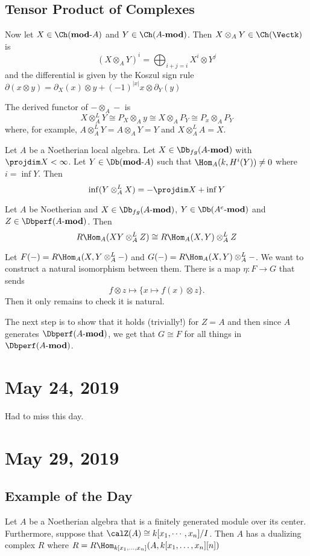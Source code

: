 \documentclass[12pt]{article}
\newcommand*{\modA}{\mathbf{mod}\text{-}A}
\newcommand*{\Amod}{A\text{-}\mathbf{mod}}
\begin{document}
\subsection{Tensor Product of Complexes}
Now let $X\in\Ch(\modA)$ and $Y\in\Ch(\Amod)$. Then $X\otimes_A Y\in\Ch(\Vectk)$ is
\[(X\otimes_A Y)^i=\bigoplus_{i+j=i}X^i\otimes Y^j\]
and the differential is given by the Koszul sign rule $\partial(x\otimes y)=\partial_X(x)\otimes y+(-1)^|x|x\otimes\partial_Y(y)$

The derived functor of $-\otimes_A-$ is 
\[X\otimes_A^LY\cong P_X\otimes_A y\cong X\otimes_A P_Y\cong P_x\otimes_AP_Y\]
where, for example, $A\otimes_A^LY=A\otimes_AY=Y$ and $X\otimes_A^LA=X$.

\begin{thm}
	Let $A$ be a Noetherian local algebra. Let $X\in\Db_{fg}(\Amod)$ with $\projdim X<\infty$. Let $Y\in\Db(\modA)$
	such that $\Hom_A(k,H^i(Y))\ne 0$ where $i=\inf Y$. Then 
	\[\inf(Y\otimes_A^LX)=-\projdim X+\inf Y\]
\end{thm}

\begin{lem}
	Let $A$ be Noetherian and $X\in\Db_{fg}(\Amod)$, $Y\in\Db(A^e\text{-}\mathbf{mod})$ and $Z\in \Dbperf(\Amod)$. Then 
	\[R\Hom_A(XY\otimes_A^LZ)\cong R\Hom_A(X,Y)\otimes_A^LZ\]
\end{lem}
\begin{prf}
	Let $F(-)=R\Hom_A(X,Y\otimes_A^L-)$ and $G(-)=R\Hom_A(X,Y)\otimes_A^L-$. We want to construct 
	a natural isomorphism between them. There is a map $\eta:F\to G$ that sends 
	\[f\otimes z\mapsto \{x\mapsto f(x)\otimes z\}.\]
	Then it only remains to check it is natural.

	The next step is to show that it holds (trivially!) for $Z=A$ and then since $A$ generates $\Dbperf(\Amod)$, we get that $G\cong F$ for all 
	things in $\Dbperf(\Amod)$.
\end{prf}

\section{May 24, 2019}
Had to miss this day.

\section{May 29, 2019}

\subsection{Example of the Day}
Let $A$ be a Noetherian algebra that is a finitely generated module over its center. Furthermore, suppose that 
$\calZ(A)\cong k[x_1,\cdots,x_n]/I$. Then $A$ has a dualizing complex $R$ where $R=R\Hom_{k[x_1,\dots,x_n]}(A,k[x_1,\dots,x_n][n])$
\end{document}
